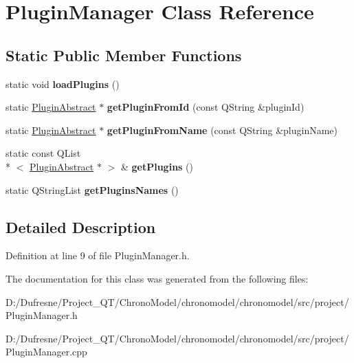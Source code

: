 \hypertarget{class_plugin_manager}{\section{Plugin\-Manager Class Reference}
\label{class_plugin_manager}
}
\subsection*{Static Public Member Functions}
\begin{DoxyCompactItemize}
\item 
\hypertarget{class_plugin_manager_a685e9abd87edf1e34fd8a29258cf19e0}{static void {\bfseries load\-Plugins} ()}\label{class_plugin_manager_a685e9abd87edf1e34fd8a29258cf19e0}

\item 
\hypertarget{class_plugin_manager_a039ad99ebee86b39edd71d6decaed42d}{static \hyperlink{class_plugin_abstract}{Plugin\-Abstract} $\ast$ {\bfseries get\-Plugin\-From\-Id} (const Q\-String \&plugin\-Id)}\label{class_plugin_manager_a039ad99ebee86b39edd71d6decaed42d}

\item 
\hypertarget{class_plugin_manager_a418dc3b797bd49e05122cfb0adc88cb3}{static \hyperlink{class_plugin_abstract}{Plugin\-Abstract} $\ast$ {\bfseries get\-Plugin\-From\-Name} (const Q\-String \&plugin\-Name)}\label{class_plugin_manager_a418dc3b797bd49e05122cfb0adc88cb3}

\item 
\hypertarget{class_plugin_manager_a2eb9ffb3a1d4e90c87b9e14e783003be}{static const Q\-List\\*
$<$ \hyperlink{class_plugin_abstract}{Plugin\-Abstract} $\ast$ $>$ \& {\bfseries get\-Plugins} ()}\label{class_plugin_manager_a2eb9ffb3a1d4e90c87b9e14e783003be}

\item 
\hypertarget{class_plugin_manager_acbda0ab9809464aacdcabfb767913617}{static Q\-String\-List {\bfseries get\-Plugins\-Names} ()}\label{class_plugin_manager_acbda0ab9809464aacdcabfb767913617}

\end{DoxyCompactItemize}


\subsection{Detailed Description}


Definition at line 9 of file Plugin\-Manager.\-h.



The documentation for this class was generated from the following files\-:\begin{DoxyCompactItemize}
\item 
D\-:/\-Dufresne/\-Project\-\_\-\-Q\-T/\-Chrono\-Model/chronomodel/chronomodel/src/project/Plugin\-Manager.\-h\item 
D\-:/\-Dufresne/\-Project\-\_\-\-Q\-T/\-Chrono\-Model/chronomodel/chronomodel/src/project/Plugin\-Manager.\-cpp\end{DoxyCompactItemize}
